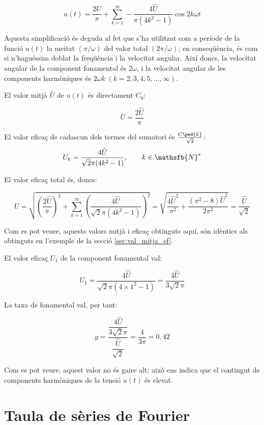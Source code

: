 \begin{exemple}[\ValorMitjaEfTaxaFon{}]
    \[
		u(t) = \frac{2\hat{U}}{\pi} + \sum_{k=1}^\infty - \frac{4\hat{U}}{\pi(4k^2-1)} \cos 2 k \omega t
    \]

    Aquesta simplificació és deguda al fet que s'ha utilitzat com a
    període de la funció $u(t)$ la meitat $(\pi/\omega)$ del valor total
    $(2\pi/\omega)$; en conseqüència, és com si n'haguéssim doblat la
    freqüència i la velocitat angular. Així doncs, la velocitat angular
    de la component fonamental és $2\omega$, i la velocitat angular de
    les components harmòniques és $2\omega k \;(k=2,3,4,5,\ldots,\infty)$.

    El valor mitjà $\bar{U}$ de $u(t)$ és directament $C_0$:

    \[
        \bar{U} = \frac{2\hat{U}}{\pi}
    \]

    El valor eficaç de cadascun dels termes del sumatori és $\frac{C\ped{k}}{\sqrt{2}}$:
    \[
        U_k =  \frac{4\hat{U}}{\sqrt{2}\pi(4k^2-1)},
        \qquad k \in \mathsfb{N}^*
    \]

    El valor eficaç total és, doncs:

    \[
        U=\sqrt{\left(\frac{2\hat{U}}{\pi}\right)^2 + \sum_{k=1}^\infty
        \left( \frac{4\hat{U}}{\sqrt{2}\pi(4k^2-1)}\right)^2} =
        \sqrt{\frac{4\hat{U}^2}{\pi^2} + \frac{(\pi^2-8)\hat{U}^2}{2\pi^2}
        }= \frac{\hat{U}}{\sqrt{2}}
    \]

    Com es pot veure, aquests valors mitjà i eficaç obtinguts aquí, són
    idèntics als obtinguts en l'exemple de la secció
    \ref{sec:val_mitja_ef}.

    El valor eficaç $U_1$ de la component fonamental val:

    \[
        U_1 =\frac{4\hat{U}}{\sqrt{2}\pi(4\times 1^2-1)} =
        \frac{4\hat{U}}{3\sqrt{2}\pi}
    \]

    La taxa de fonamental val, per tant:

    \[
        g =
        \frac{\dfrac{4\hat{U}}{3\sqrt{2}\pi}}{\dfrac{\hat{U}}{\sqrt{2}}}
        =\frac{4}{3\pi} = 0,{42}
    \]

    Com es pot veure, aquest valor no és gaire alt; això ens indica que
    el contingut de components harmòniques de la tensió $u(t)$ és
    elevat.
\end{exemple}


\section{Taula de sèries de Fourier}

